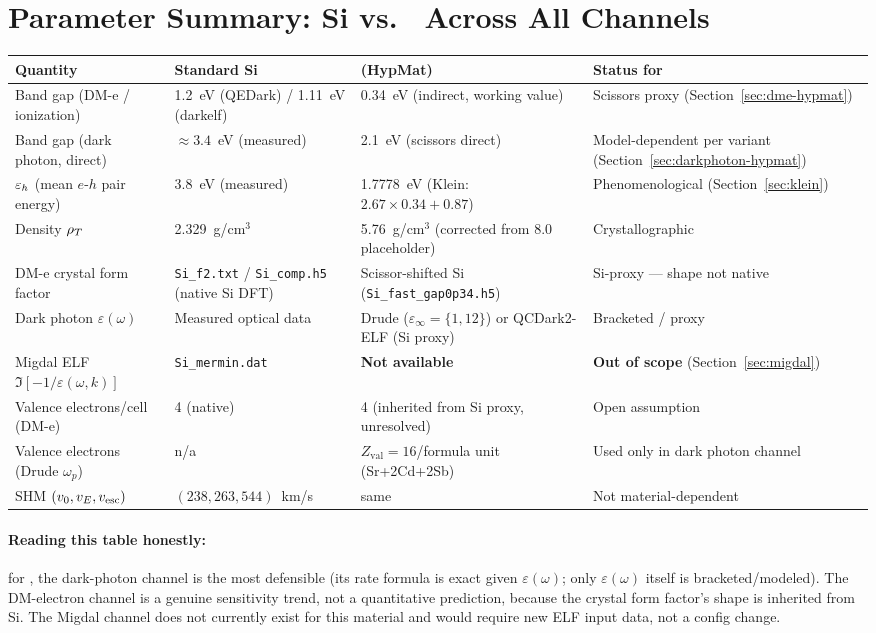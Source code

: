 \section{Parameter Summary: Si vs.\ \SrCdSb{} Across All Channels}
\label{sec:summary}

\begin{center}
\begin{longtable}{@{}p{3.6cm}p{3.7cm}p{4.2cm}p{2.8cm}@{}}
\toprule
Quantity & Standard Si & \SrCdSb{} (HypMat) & Status for \SrCdSb{} \\
\midrule
\endhead
Band gap (DM-e / ionization) & 1.2~eV (QEDark) / 1.11~eV (darkelf) &
  0.34~eV (indirect, working value) & Scissors proxy (Section~\ref{sec:dme-hypmat}) \\
Band gap (dark photon, direct) & $\approx3.4$~eV (measured) &
  2.1~eV (scissors direct) & Model-dependent per variant (Section~\ref{sec:darkphoton-hypmat}) \\
$\varepsilon_h$ (mean $e$-$h$ pair energy) & 3.8~eV (measured) &
  1.7778~eV (Klein: $2.67\times0.34+0.87$) & Phenomenological (Section~\ref{sec:klein}) \\
Density $\rho_T$ & 2.329~g/cm$^3$ &
  5.76~g/cm$^3$ (corrected from 8.0 placeholder) & Crystallographic \\
DM-e crystal form factor & \texttt{Si\_f2.txt} / \texttt{Si\_comp.h5} (native Si DFT) &
  Scissor-shifted Si (\texttt{Si\_fast\_gap0p34.h5}) & Si-proxy — shape not native \\
Dark photon $\varepsilon(\omega)$ & Measured optical data &
  Drude ($\varepsilon_\infty=\{1,12\}$) or QCDark2-ELF (Si proxy) & Bracketed / proxy \\
Migdal ELF $\Im[-1/\varepsilon(\omega,k)]$ & \texttt{Si\_mermin.dat} &
  \textbf{Not available} & \textbf{Out of scope} (Section~\ref{sec:migdal}) \\
Valence electrons/cell (DM-e) & 4 (native) &
  4 (inherited from Si proxy, unresolved) & Open assumption \\
Valence electrons (Drude $\omega_p$) & n/a &
  $Z_\mathrm{val}=16$/formula unit (Sr+2Cd+2Sb) & Used only in dark photon channel \\
SHM $(v_0,v_E,v_\mathrm{esc})$ & $(238,263,544)$~km/s & same & Not material-dependent \\
\bottomrule
\end{longtable}
\end{center}

\paragraph{Reading this table honestly:} for \SrCdSb{}, the dark-photon
channel is the most defensible (its rate formula is exact given
$\varepsilon(\omega)$; only $\varepsilon(\omega)$ itself is
bracketed/modeled). The DM-electron channel is a genuine sensitivity trend,
not a quantitative prediction, because the crystal form factor's shape is
inherited from Si. The Migdal channel does not currently exist for this
material and would require new ELF input data, not a config change.
